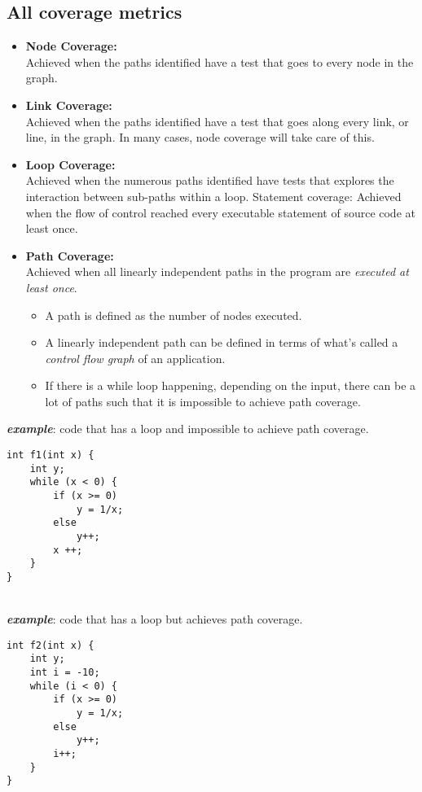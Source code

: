 \documentclass[a4paper]{article}
\begin{document}
\subsection{All coverage metrics}
\begin{itemize}
	\item \textbf{Node Coverage:} \\Achieved when the paths identified have a test that goes to every node in the graph.
	\item \textbf{Link Coverage:} \\Achieved when the paths identified have a test that goes along every link, or line, in the graph. In many cases, node coverage will take care of this.
	\item \textbf{Loop Coverage:} \\Achieved when the numerous paths identified have tests that explores the interaction between sub-paths within a loop.
	Statement coverage: Achieved when the flow of control reached every executable statement of source code at least once.
	\item \textbf{Path Coverage:} \\Achieved when all linearly independent paths in the program are \textit{executed at least once}.
	\begin{itemize}[label=$\circ$]
		\item A path is defined as the number of nodes executed.
		\item A linearly independent path can be defined in terms of what’s called a \textit{control flow graph} of an application.
		\item If there is a while loop happening, depending on the input, there can be a lot of paths such that it is impossible to achieve path coverage.
	\end{itemize}
\end{itemize}
\textbf{\textit{example}}: code that has a loop and impossible to achieve path coverage.
\begin{verbatim}
int f1(int x) {
	int y;
	while (x < 0) {
		if (x >= 0) 
			y = 1/x;
		else
			y++;
		x ++;
	}
}
\end{verbatim}
\mbox{}\\
\textbf{\textit{example}}: code that has a loop but achieves path coverage.
\begin{verbatim}
int f2(int x) {
	int y;
	int i = -10;
	while (i < 0) {
		if (x >= 0)
			y = 1/x;
		else
			y++;
		i++;
	}
}
\end{verbatim}
\end{document}
